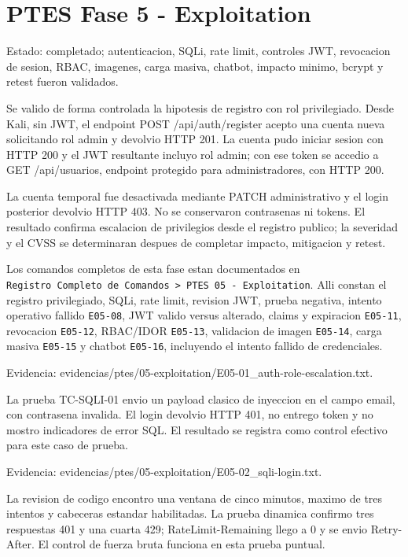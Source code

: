 \section{PTES Fase 5 - Exploitation}\label{ptes-fase-5---exploitation}

Estado: completado; autenticacion, SQLi, rate limit, controles JWT, revocacion de sesion, RBAC, imagenes, carga masiva, chatbot, impacto minimo, bcrypt y retest fueron validados.

Se valido de forma controlada la hipotesis de registro con rol privilegiado. Desde Kali, sin JWT, el endpoint POST /api/auth/register acepto una cuenta nueva solicitando rol admin y devolvio HTTP 201. La cuenta pudo iniciar sesion con HTTP 200 y el JWT resultante incluyo rol admin; con ese token se accedio a GET /api/usuarios, endpoint protegido para administradores, con HTTP 200.

La cuenta temporal fue desactivada mediante PATCH administrativo y el login posterior devolvio HTTP 403. No se conservaron contrasenas ni tokens. El resultado confirma escalacion de privilegios desde el registro publico; la severidad y el CVSS se determinaran despues de completar impacto, mitigacion y retest.

Los comandos completos de esta fase estan documentados en \texttt{Registro\ Completo\ de\ Comandos\ \textgreater{}\ PTES\ 05\ -\ Exploitation}. Alli constan el registro privilegiado, SQLi, rate limit, revision JWT, prueba negativa, intento operativo fallido \texttt{E05-08}, JWT valido versus alterado, claims y expiracion \texttt{E05-11}, revocacion \texttt{E05-12}, RBAC/IDOR \texttt{E05-13}, validacion de imagen \texttt{E05-14}, carga masiva \texttt{E05-15} y chatbot \texttt{E05-16}, incluyendo el intento fallido de credenciales.

Evidencia: evidencias/ptes/05-exploitation/E05-01\_auth-role-escalation.txt.

La prueba TC-SQLI-01 envio un payload clasico de inyeccion en el campo email, con contrasena invalida. El login devolvio HTTP 401, no entrego token y no mostro indicadores de error SQL. El resultado se registra como control efectivo para este caso de prueba.

Evidencia: evidencias/ptes/05-exploitation/E05-02\_sqli-login.txt.

La revision de codigo encontro una ventana de cinco minutos, maximo de tres intentos y cabeceras estandar habilitadas. La prueba dinamica confirmo tres respuestas 401 y una cuarta 429; RateLimit-Remaining llego a 0 y se envio Retry-After. El control de fuerza bruta funciona en esta prueba puntual.

